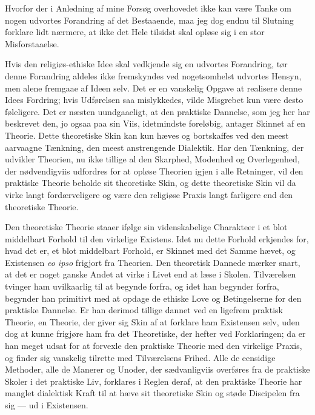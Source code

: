 \documentclass[12pt,a4paper]{book}
\newcommand{\opage}[1]{\marginnote{\footnotesize\textit{[#1]}}}
\begin{document}
Hvorfor der i Anledning af mine Forsøg overhovedet ikke
\opage{166} kan være Tanke om nogen udvortes Forandring af det Bestaaende, maa jeg dog
endnu til Slutning forklare lidt nærmere, at ikke det Hele tilsidst skal
opløse sig i en stor Misforstaaelse.

Hvis den religiøs-ethiske Idee skal vedkjende sig en udvortes Forandring, tør
denne Forandring aldeles ikke fremskyndes ved nogetsomhelst udvortes Hensyn,
men alene fremgaae af Ideen selv. Det er en vanskelig Opgave at realisere
denne Idees Fordring; hvis Udførelsen saa mislykkedes, vilde Misgrebet kun
være desto føleligere. Det er næsten uundgaaeligt, at den praktiske Dannelse,
som jeg her har beskrevet den, jo ogsaa paa sin Viis, idetmindste foreløbig,
antager Skinnet af en Theorie. Dette theoretiske Skin kan kun hæves og
bortskaffes ved den meest aarvaagne Tænkning, den meest anstrengende
Dialektik. Har den Tænkning, der udvikler Theorien, nu ikke tillige al den
Skarphed, Modenhed og Overlegenhed, der nødvendigviis udfordres for at opløse
Theorien igjen i alle Retninger, vil den praktiske Theorie beholde sit
theoretiske Skin, og dette theoretiske Skin vil da virke langt fordærveligere
og være den religiøse Praxis langt farligere end den theoretiske Theorie.

Den theoretiske Theorie staaer ifølge sin videnskabelige Charakteer i et blot
middelbart Forhold til den virkelige Existens. Idet nu dette Forhold
erkjendes for, hvad det er, et blot middelbart Forhold, er Skinnet med det
Samme hævet, og Existensen \textit{eo ipso} frigjort fra Theorien. Den
theoretisk Dannede mærker snart, at det er noget ganske Andet at virke i
Livet end at læse i Skolen. Tilværelsen tvinger ham uvilkaarlig til at
begynde forfra, og idet han begynder forfra, begynder han primitivt med at
opdage de ethiske Love og Betingelserne for den praktiske Dannelse. Er han
derimod tillige dannet ved en ligefrem praktisk Theorie, en Theorie, der
giver sig Skin af at forklare ham Existensen selv, uden dog at kunne frigjøre
ham fra det Theoretiske, der hefter ved Forklaringen; da er han meget
\opage{167} udsat for at forvexle den praktiske Theorie med den virkelige Praxis, og
finder sig vanskelig tilrette med Tilværelsens Frihed. Alle de eensidige
Methoder, alle de Manerer og Unoder, der sædvanligviis overføres fra de
praktiske Skoler i det praktiske Liv, forklares i Reglen deraf, at den
praktiske Theorie har manglet dialektisk Kraft til at hæve sit theoretiske
Skin og støde Discipelen fra sig --- ud i Existensen.
\end{document}
